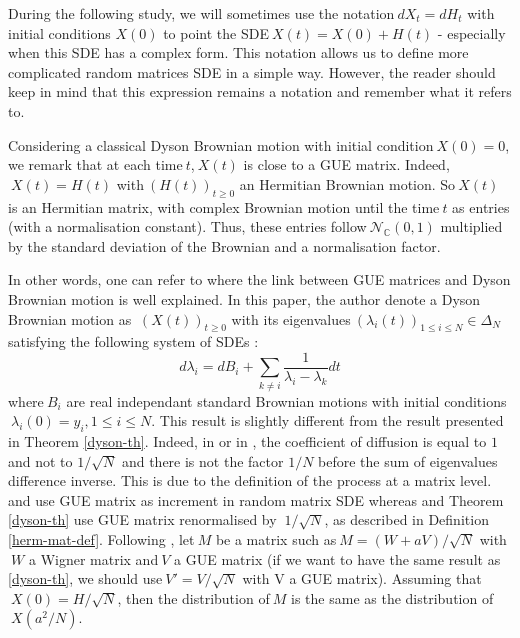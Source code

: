 	\begin{remark}\label{rem: matrix SDE notation}
	During the following study, we will sometimes use the notation$\ dX_t = dH_t$ with initial conditions $X(0)$ to point the SDE$\ X(t)=X(0)+H(t)$ - especially when this SDE has a complex form. This notation allows us to define more complicated random matrices SDE in a simple way. However, the reader should keep in mind that this expression remains a notation and remember what it refers to.
	\end{remark}
	
Considering a classical Dyson Brownian motion with initial condition$\ X(0)=0$, we remark that at each time$\ t$,$\ X(t)$ is close to a GUE matrix. Indeed,$\ X(t)=H(t)$ with$\ (H(t))_{t\geq0}$ an Hermitian Brownian motion. So$\ X(t)$ is an Hermitian matrix, with complex Brownian motion until the time$\ t$ as entries (with a normalisation constant). Thus, these entries follow$\ \mathcal{N}_{\mathbb{C}}(0,1)$ multiplied by the standard deviation of the Brownian and a normalisation factor.

		In other words, one can refer to \cite{Jo2001} where the link between GUE matrices and Dyson Brownian motion is well explained. In this paper, the author denote a Dyson Brownian motion as $\ (X(t))_{t\geq 0}$ with its eigenvalues$\ (\lambda_i(t))_{1\leq i\leq N} \in \Delta_N$ satisfying the following system of SDEs : 
		\begin{equation}
			d\lambda_i = dB_i + \sum_{k \neq i} \frac{1}{\lambda_i - \lambda_k}dt
		\end{equation}
		where$\ B_i$ are real independant standard Brownian motions with initial conditions$\ \lambda_i(0) = y_i, 1\leq i\leq N$.
		This result is slightly different from the result presented in Theorem \ref{dyson-th}. Indeed, in \cite{taotopics} or in \cite{Jo2001}, the coefficient of diffusion is equal to $1$ and not to $1/\sqrt{N}$ and there is not the factor $1/N$ before the sum of eigenvalues difference inverse. This is due to the definition of the process at a matrix level. \cite{taotopics} and \cite{Jo2001} use GUE matrix as increment in random matrix SDE whereas \cite{agz} and Theorem \ref{dyson-th} use GUE matrix renormalised by $\ 1/\sqrt{N}$, as described in Definition \ref{herm-mat-def}.
		Following \cite{Jo2001}, let$\ M$ be a matrix such as$\ M=(W+aV)/\sqrt{N}$ with$\ W$ a Wigner matrix and$\ V$ a GUE matrix (if we want to have the same result as \ref{dyson-th}, we should use$\ V' = V/\sqrt{N}$ with V a GUE matrix). Assuming that$\ X(0) = H/\sqrt{N}$, then the distribution of$\ M$ is the same as the distribution of$\ X(a^2/N)$. \newline


